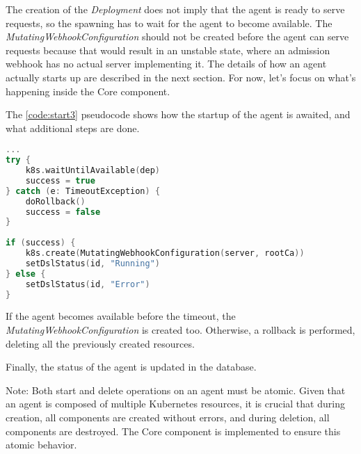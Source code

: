 The creation of the \emph{Deployment} does not imply that the agent is ready to serve requests, so the spawning has to wait for the agent to become available. The \emph{MutatingWebhookConfiguration} should not be created before the agent can serve requests because that would result in an unstable state, where an admission webhook has no actual server implementing it. The details of how an agent actually starts up are described in the next section. For now, let's focus on what's happening inside the Core component.

The \ref{code:start3} pseudocode shows how the startup of the agent is awaited, and what additional steps are done.

\begin{lstlisting}[caption={Spawning of an agent},language=Kotlin,label=code:start3]
...
try {
    k8s.waitUntilAvailable(dep)
    success = true
} catch (e: TimeoutException) {
    doRollback()
    success = false
}
        
if (success) {
    k8s.create(MutatingWebhookConfiguration(server, rootCa))
    setDslStatus(id, "Running")
} else {
    setDslStatus(id, "Error")
}
\end{lstlisting}

If the agent becomes available before the timeout, the \emph{MutatingWebhookConfiguration} is created too. Otherwise, a rollback is performed, deleting all the previously created resources.

Finally, the status of the agent is updated in the database.

Note: Both start and delete operations on an agent must be atomic. Given that an agent is composed of multiple Kubernetes resources, it is crucial that during creation, all components are created without errors, and during deletion, all components are destroyed. The Core component is implemented to ensure this atomic behavior.
